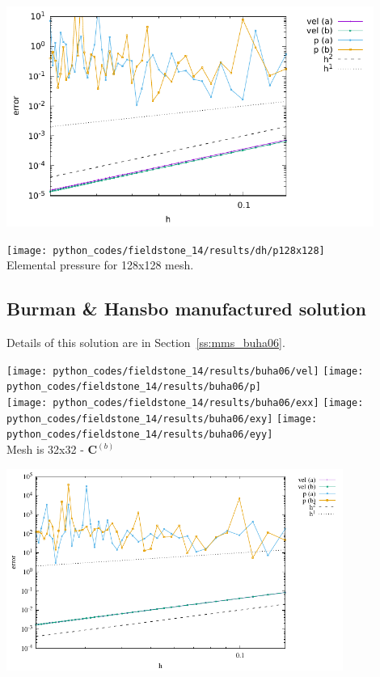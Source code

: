 \begin{center}
\includegraphics[width=12cm]{python_codes/fieldstone_14/results/dh/errors.pdf}
\end{center}


\begin{center}
\texttt{[image: python\_codes/fieldstone\_14/results/dh/p128x128]}\\
{\captionfont Elemental pressure for 128x128 mesh.}
\end{center}

\newpage
\subsection*{Burman \& Hansbo manufactured solution}

Details of this solution are in Section~\ref{ss:mms_buha06}.


\begin{center}
\texttt{[image: python\_codes/fieldstone\_14/results/buha06/vel]}
\texttt{[image: python\_codes/fieldstone\_14/results/buha06/p]}\\
\texttt{[image: python\_codes/fieldstone\_14/results/buha06/exx]}
\texttt{[image: python\_codes/fieldstone\_14/results/buha06/exy]}
\texttt{[image: python\_codes/fieldstone\_14/results/buha06/eyy]}\\
{\captionfont Mesh is 32x32 - ${\bm C}^{(b)}$}
\end{center}


\begin{center}
\includegraphics[width=11cm]{python_codes/fieldstone_14/results/buha06/errors.pdf}
\end{center}

